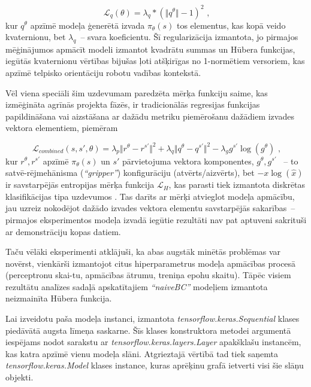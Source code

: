 \documentclass[12pt, a4paper]{article}
\numberwithin{equation}{section} %
\begin{document}
\begin{equation}
    \mathcal{L}_{q}(\theta) = \lambda_{q} * (\Vert q^{\theta} \Vert - 1)^2
\text{ ,}
\end{equation}
kur $q^{\theta}$ apzīmē modeļa ģenerētā izvada $\pi_{\theta}(s)$ tos elementus, kas kopā veido kvaternionu, bet $\lambda_q$~-- svara koeficientu. Šī regularizācija izmantota, jo pirmajos mēģinājumos apmācīt modeli izmantot kvadrātu summas un Hūbera funkcijas, iegūtās kvaternionu vērtības bijušas ļoti atšķirīgas no 1-normētiem versoriem, kas apzīmē telpisko orientāciju robotu vadības kontekstā. 

Vēl viena speciāli šim uzdevumam paredzēta mērķa funkciju saime, kas izmēģināta agrīnās projekta fāzēs, ir tradicionālās regresijas funkcijas papildināšana vai aizstāšana ar dažādu metriku piemērošanu dažādiem izvades vektora elementiem, piemēram

\begin{equation}
    \mathcal{L}_{combined}(s,s',\theta) = \lambda_p \Vert r^{\theta} - r^{s'}\Vert^2 + 
    \lambda_q \Vert q^{\theta} - q^{s'}\Vert^2 - 
    \lambda_g  g^{s'} \log(g^{\theta})
\text{ ,}
\end{equation}
kur $r^{\theta}, r^{s'}$ apzīmē $\pi_{\theta}(s)$ un $s'$ pārvietojuma vektora komponentes, $g^{\theta}, g^{s'}$ ~-- to satvē-rējmehānisma (\textit{``gripper''}) konfigurāciju (atvērts/aizvērts), bet $-x\log(\hat{x})$ ir savstarpējās entropijas mērķa funkcija $\mathcal{L}_H$, kas parasti tiek izmantota diskrētas klasifikācijas tipa uzdevumos \cite{keras_crossentropy}. Tas darīts ar mērķi atvieglot modeļa apmācību, jau uzreiz nokodējot dažādo izvades vektora elementu savstarpējās sakarības~-- pirmajos eksperimentos modeļa izvadā iegūtie rezultāti nav pat aptuveni sakrituši ar demonstrāciju kopas datiem.

Taču vēlāki eksperimenti atklājuši, ka abas augstāk minētās problēmas var novērst, vienkārši izmantojot citus hiperparametrus modeļa apmācības procesā (perceptronu skai-tu, apmācības ātrumu, treniņa epohu skaitu). Tāpēc visiem rezultātu analīzes sadaļā apskatītajiem \textit{``naiveBC''} modeļiem izmantota neizmainīta Hūbera funkcija.

Lai izveidotu paša modeļa instanci, izmantota \textit{tensorflow.keras.Sequential} klases piedāvātā augsta līmeņa saskarne. Šīs klases konstruktora metodei argumentā iespējams nodot sarakstu ar \textit{tensorflow.keras.layers.Layer} apakšklašu instancēm, kas katra apzīmē vienu modeļa slāni. Atgrieztajā vērtībā tad tiek saņemta \textit{tensorflow.keras.Model} klases instance, kuras aprēķinu grafā ietverti visi šie slāņu objekti.
\end{document}
